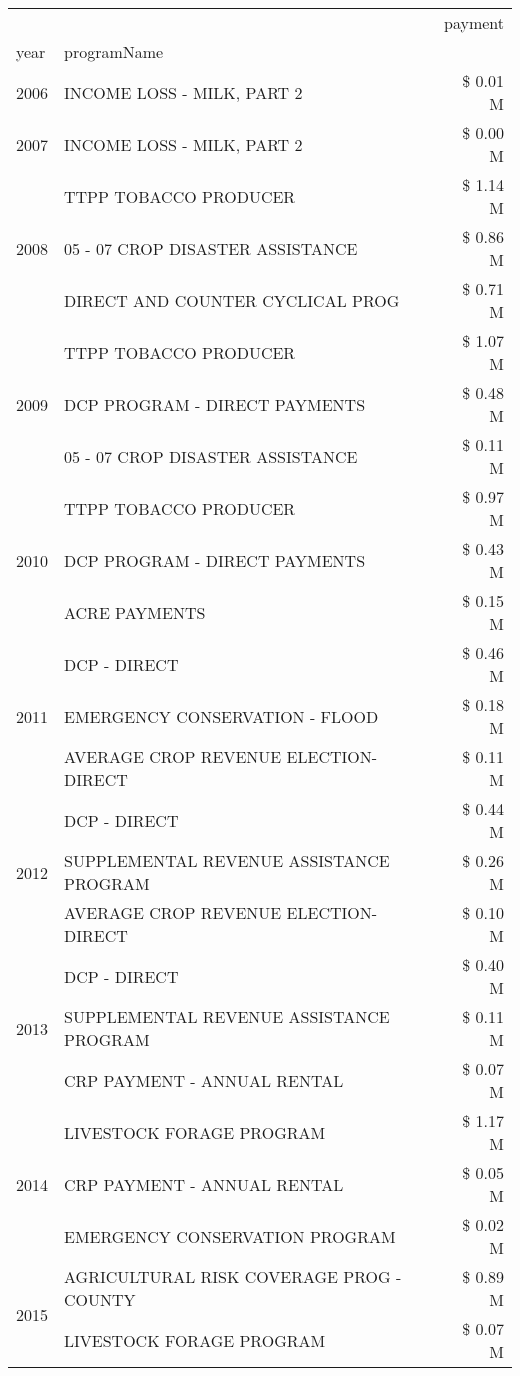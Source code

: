 \begin{tabular}{llr}
\toprule
 &  & payment \\
year & programName &  \\
\midrule
2006 & INCOME LOSS - MILK, PART 2 & \$ 0.01 M \\
\cline{1-3}
2007 & INCOME LOSS - MILK, PART 2 & \$ 0.00 M \\
\cline{1-3}
\multirow[t]{3}{*}{2008} & TTPP TOBACCO PRODUCER & \$ 1.14 M \\
 & 05 - 07 CROP DISASTER ASSISTANCE & \$ 0.86 M \\
 & DIRECT AND COUNTER CYCLICAL PROG & \$ 0.71 M \\
\cline{1-3}
\multirow[t]{3}{*}{2009} & TTPP TOBACCO PRODUCER & \$ 1.07 M \\
 & DCP PROGRAM - DIRECT PAYMENTS & \$ 0.48 M \\
 & 05 - 07 CROP DISASTER ASSISTANCE & \$ 0.11 M \\
\cline{1-3}
\multirow[t]{3}{*}{2010} & TTPP TOBACCO PRODUCER & \$ 0.97 M \\
 & DCP PROGRAM - DIRECT PAYMENTS & \$ 0.43 M \\
 & ACRE PAYMENTS & \$ 0.15 M \\
\cline{1-3}
\multirow[t]{3}{*}{2011} & DCP - DIRECT & \$ 0.46 M \\
 & EMERGENCY CONSERVATION - FLOOD & \$ 0.18 M \\
 & AVERAGE CROP REVENUE ELECTION-DIRECT & \$ 0.11 M \\
\cline{1-3}
\multirow[t]{3}{*}{2012} & DCP - DIRECT & \$ 0.44 M \\
 & SUPPLEMENTAL REVENUE ASSISTANCE PROGRAM & \$ 0.26 M \\
 & AVERAGE CROP REVENUE ELECTION-DIRECT & \$ 0.10 M \\
\cline{1-3}
\multirow[t]{3}{*}{2013} & DCP - DIRECT & \$ 0.40 M \\
 & SUPPLEMENTAL REVENUE ASSISTANCE PROGRAM & \$ 0.11 M \\
 & CRP PAYMENT - ANNUAL RENTAL & \$ 0.07 M \\
\cline{1-3}
\multirow[t]{3}{*}{2014} & LIVESTOCK FORAGE PROGRAM & \$ 1.17 M \\
 & CRP PAYMENT - ANNUAL RENTAL & \$ 0.05 M \\
 & EMERGENCY CONSERVATION PROGRAM & \$ 0.02 M \\
\cline{1-3}
\multirow[t]{3}{*}{2015} & AGRICULTURAL RISK COVERAGE PROG - COUNTY & \$ 0.89 M \\
 & LIVESTOCK FORAGE PROGRAM & \$ 0.07 M \\

\end{tabular}
